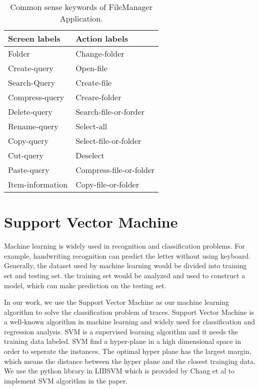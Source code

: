 \begin{table}[ht]
	\begin{center}
		\begin{tabular}{ l | l }
			\hline
			Screen labels & Action labels \\
			\hline\hline
			Folder & Change-folder \\
			Create-query & Open-file \\
			Search-Query & Create-file \\
			Compress-query & Creare-folder \\
			Delete-query & Search-file-or-forder \\
			Rename-query & Select-all \\
			Copy-query & Select-file-or-folder \\
			Cut-query & Deselect \\
			Paste-query & Compress-file-or-folder \\
			Item-information & Copy-file-or-folder \\	
		\end{tabular}
		\caption{ Common sense keywords of FileManager Application.  }
		\label{LabelDictionaryTable}
	\end{center}
\end{table}


\clearpage

\section{Support Vector Machine}

Machine learning is widely used in recognition and classification problems.
For example, handwriting recognition can predict the letter without using keyboard.
Generally, the dataset used by machine learning would be divided into training set and testing set.
the training set would be analyzed and used to construct a model,
which can make prediction on the testing set.

In our work, we use the Support Vector Machine\cite{SVM} as our machine learning algorithm to solve the classification problem of traces.
Support Vector Machine is a well-known algorithm in machine learning and widely used for classification and regression analysis.
SVM is a supervised learning algorithm and it needs the training data labeled.
SVM find a hyper-plane in a high dimensional space in order to seperate the instances.
The optimal hyper plane has the largest margin, which means the distance between the hyper plane and the closest trainging data.
We use the python library in LIBSVM which is provided by Chang et al \cite{LIBSVM} to implement SVM algorithm in the paper.

